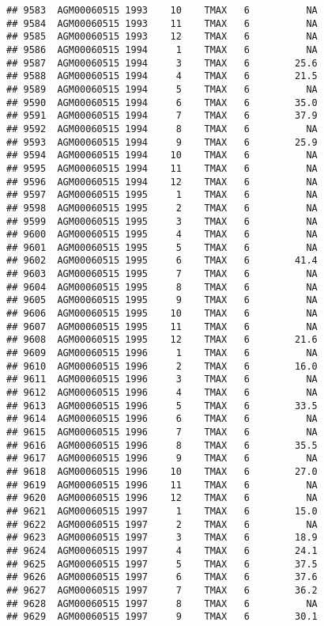 \documentclass{article}\usepackage[]{graphicx}\usepackage[]{color}
\makeatletter
\newenvironment{kframe}{%
 \def\at@end@of@kframe{}%
 \ifinner\ifhmode%
  \def\at@end@of@kframe{\end{minipage}}%
  \begin{minipage}{\columnwidth}%
 \fi\fi%
 \def\FrameCommand##1{\hskip\@totalleftmargin \hskip-\fboxsep
 \colorbox{shadecolor}{##1}\hskip-\fboxsep
     \hskip-\linewidth \hskip-\@totalleftmargin \hskip\columnwidth}%
 \MakeFramed {\advance\hsize-\width
   \@totalleftmargin\z@ \linewidth\hsize
   \@setminipage}}%
 {\par\unskip\endMakeFramed%
 \at@end@of@kframe}
\newenvironment{knitrout}{}{} %
\makeatother
\begin{document}
\begin{knitrout}
\begin{kframe}
\begin{verbatim}
## 9583  AGM00060515 1993    10    TMAX   6          NA
## 9584  AGM00060515 1993    11    TMAX   6          NA
## 9585  AGM00060515 1993    12    TMAX   6          NA
## 9586  AGM00060515 1994     1    TMAX   6          NA
## 9587  AGM00060515 1994     3    TMAX   6        25.6
## 9588  AGM00060515 1994     4    TMAX   6        21.5
## 9589  AGM00060515 1994     5    TMAX   6          NA
## 9590  AGM00060515 1994     6    TMAX   6        35.0
## 9591  AGM00060515 1994     7    TMAX   6        37.9
## 9592  AGM00060515 1994     8    TMAX   6          NA
## 9593  AGM00060515 1994     9    TMAX   6        25.9
## 9594  AGM00060515 1994    10    TMAX   6          NA
## 9595  AGM00060515 1994    11    TMAX   6          NA
## 9596  AGM00060515 1994    12    TMAX   6          NA
## 9597  AGM00060515 1995     1    TMAX   6          NA
## 9598  AGM00060515 1995     2    TMAX   6          NA
## 9599  AGM00060515 1995     3    TMAX   6          NA
## 9600  AGM00060515 1995     4    TMAX   6          NA
## 9601  AGM00060515 1995     5    TMAX   6          NA
## 9602  AGM00060515 1995     6    TMAX   6        41.4
## 9603  AGM00060515 1995     7    TMAX   6          NA
## 9604  AGM00060515 1995     8    TMAX   6          NA
## 9605  AGM00060515 1995     9    TMAX   6          NA
## 9606  AGM00060515 1995    10    TMAX   6          NA
## 9607  AGM00060515 1995    11    TMAX   6          NA
## 9608  AGM00060515 1995    12    TMAX   6        21.6
## 9609  AGM00060515 1996     1    TMAX   6          NA
## 9610  AGM00060515 1996     2    TMAX   6        16.0
## 9611  AGM00060515 1996     3    TMAX   6          NA
## 9612  AGM00060515 1996     4    TMAX   6          NA
## 9613  AGM00060515 1996     5    TMAX   6        33.5
## 9614  AGM00060515 1996     6    TMAX   6          NA
## 9615  AGM00060515 1996     7    TMAX   6          NA
## 9616  AGM00060515 1996     8    TMAX   6        35.5
## 9617  AGM00060515 1996     9    TMAX   6          NA
## 9618  AGM00060515 1996    10    TMAX   6        27.0
## 9619  AGM00060515 1996    11    TMAX   6          NA
## 9620  AGM00060515 1996    12    TMAX   6          NA
## 9621  AGM00060515 1997     1    TMAX   6        15.0
## 9622  AGM00060515 1997     2    TMAX   6          NA
## 9623  AGM00060515 1997     3    TMAX   6        18.9
## 9624  AGM00060515 1997     4    TMAX   6        24.1
## 9625  AGM00060515 1997     5    TMAX   6        37.5
## 9626  AGM00060515 1997     6    TMAX   6        37.6
## 9627  AGM00060515 1997     7    TMAX   6        36.2
## 9628  AGM00060515 1997     8    TMAX   6          NA
## 9629  AGM00060515 1997     9    TMAX   6        30.1

\end{verbatim}
\end{kframe}
\end{knitrout}
\end{document}
